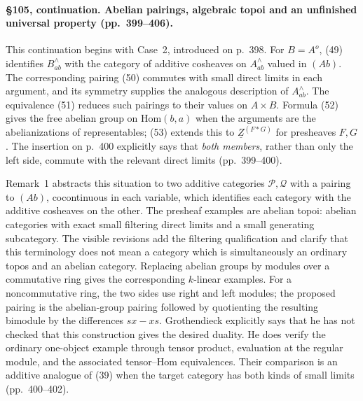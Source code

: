 \paragraph{\S105, continuation. Abelian pairings, algebraic topoi and an unfinished universal property (pp.\ 399--406).}
This continuation begins with Case~2, introduced on p.\ 398. For $B=A^o$, (49) identifies $B^\wedge_{ab}$ with the category of additive cosheaves on $A^\wedge_{ab}$ valued in $(Ab)$. The corresponding pairing (50) commutes with small direct limits in each argument, and its symmetry supplies the analogous description of $A^\wedge_{ab}$. The equivalence (51) reduces such pairings to their values on $A\times B$. Formula (52) gives the free abelian group on $\mathrm{Hom}(b,a)$ when the arguments are the abelianizations of representables; (53) extends this to $\underline Z^{(F*G)}$ for presheaves $F,G$. The insertion on p.\ 400 explicitly says that \emph{both members}, rather than only the left side, commute with the relevant direct limits (pp.\ 399--400).

Remark~1 abstracts this situation to two additive categories $\mathcal P,\mathcal Q$ with a pairing to $(Ab)$, cocontinuous in each variable, which identifies each category with the additive cosheaves on the other. The presheaf examples are abelian topoi: abelian categories with exact small filtering direct limits and a small generating subcategory. The visible revisions add the filtering qualification and clarify that this terminology does not mean a category which is simultaneously an ordinary topos and an abelian category. Replacing abelian groups by modules over a commutative ring gives the corresponding $k$-linear examples. For a noncommutative ring, the two sides use right and left modules; the proposed pairing is the abelian-group pairing followed by quotienting the resulting bimodule by the differences $sx-xs$. Grothendieck explicitly says that he has not checked that this construction gives the desired duality. He does verify the ordinary one-object example through tensor product, evaluation at the regular module, and the associated tensor--Hom equivalences. Their comparison is an additive analogue of (39) when the target category has both kinds of small limits (pp.\ 400--402).

